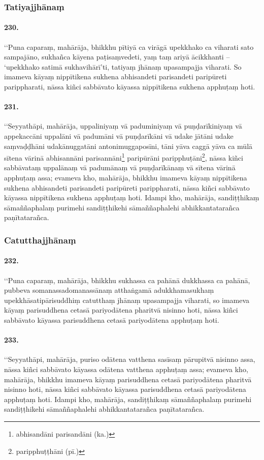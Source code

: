 \subsubsection{Tatiyajjhānaṃ}

\paragraph{230.} ‘‘Puna caparaṃ, mahārāja, bhikkhu pītiyā ca virāgā upekkhako ca viharati sato sampajāno, sukhañca kāyena paṭisaṃvedeti, yaṃ taṃ ariyā ācikkhanti – ‘upekkhako satimā sukhavihārī’ti, tatiyaṃ jhānaṃ upasampajja viharati. So imameva kāyaṃ nippītikena sukhena abhisandeti parisandeti paripūreti parippharati, nāssa kiñci sabbāvato kāyassa nippītikena sukhena apphuṭaṃ hoti.

\paragraph{231.} ‘‘Seyyathāpi, mahārāja, uppaliniyaṃ vā paduminiyaṃ vā puṇḍarīkiniyaṃ vā appekaccāni uppalāni vā padumāni vā puṇḍarīkāni vā udake jātāni udake saṃvaḍḍhāni udakānuggatāni antonimuggaposīni, tāni yāva caggā yāva ca mūlā sītena vārinā abhisannāni parisannāni\footnote{abhisandāni parisandāni (ka.)} paripūrāni paripphuṭāni\footnote{paripphuṭṭhāni (pī.)}, nāssa kiñci sabbāvataṃ uppalānaṃ vā padumānaṃ vā puṇḍarīkānaṃ vā sītena vārinā apphuṭaṃ assa; evameva kho, mahārāja, bhikkhu imameva kāyaṃ nippītikena sukhena abhisandeti parisandeti paripūreti parippharati, nāssa kiñci sabbāvato kāyassa nippītikena sukhena apphuṭaṃ hoti. Idampi kho, mahārāja, sandiṭṭhikaṃ sāmaññaphalaṃ purimehi sandiṭṭhikehi sāmaññaphalehi abhikkantatarañca paṇītatarañca.

\subsubsection{Catutthajjhānaṃ}

\paragraph{232.} ‘‘Puna caparaṃ, mahārāja, bhikkhu sukhassa ca pahānā dukkhassa ca pahānā, pubbeva somanassadomanassānaṃ atthaṅgamā adukkhamasukhaṃ upekkhāsatipārisuddhiṃ catutthaṃ jhānaṃ upasampajja viharati, so imameva kāyaṃ parisuddhena cetasā pariyodātena pharitvā nisinno hoti, nāssa kiñci sabbāvato kāyassa parisuddhena cetasā pariyodātena apphuṭaṃ hoti.

\paragraph{233.} ‘‘Seyyathāpi, mahārāja, puriso odātena vatthena sasīsaṃ pārupitvā nisinno assa, nāssa kiñci sabbāvato kāyassa odātena vatthena apphuṭaṃ assa; evameva kho, mahārāja, bhikkhu imameva kāyaṃ parisuddhena cetasā pariyodātena pharitvā nisinno hoti, nāssa kiñci sabbāvato kāyassa parisuddhena cetasā pariyodātena apphuṭaṃ hoti. Idampi kho, mahārāja, sandiṭṭhikaṃ sāmaññaphalaṃ purimehi sandiṭṭhikehi sāmaññaphalehi abhikkantatarañca paṇītatarañca.

